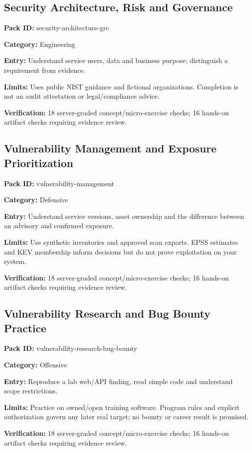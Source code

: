 \subsection{Security Architecture, Risk and Governance}
\noindent\textbf{Pack ID:} security-architecture-grc\par
\noindent\textbf{Category:} Engineering\par
\noindent\textbf{Entry:} Understand service users, data and business purpose; distinguish a requirement from evidence.\par
\noindent\textbf{Limits:} Uses public NIST guidance and fictional organizations. Completion is not an audit attestation or legal/compliance advice.\par
\noindent\textbf{Verification:} 18 server-graded concept/micro-exercise checks; 16 hands-on artifact checks requiring evidence review.\par
\subsection{Vulnerability Management and Exposure Prioritization}
\noindent\textbf{Pack ID:} vulnerability-management\par
\noindent\textbf{Category:} Defensive\par
\noindent\textbf{Entry:} Understand service versions, asset ownership and the difference between an advisory and confirmed exposure.\par
\noindent\textbf{Limits:} Use synthetic inventories and approved scan exports. EPSS estimates and KEV membership inform decisions but do not prove exploitation on your system.\par
\noindent\textbf{Verification:} 18 server-graded concept/micro-exercise checks; 16 hands-on artifact checks requiring evidence review.\par
\subsection{Vulnerability Research and Bug Bounty Practice}
\noindent\textbf{Pack ID:} vulnerability-research-bug-bounty\par
\noindent\textbf{Category:} Offensive\par
\noindent\textbf{Entry:} Reproduce a lab web/API finding, read simple code and understand scope restrictions.\par
\noindent\textbf{Limits:} Practice on owned/open training software. Program rules and explicit authorization govern any later real target; no bounty or career result is promised.\par
\noindent\textbf{Verification:} 18 server-graded concept/micro-exercise checks; 16 hands-on artifact checks requiring evidence review.\par
